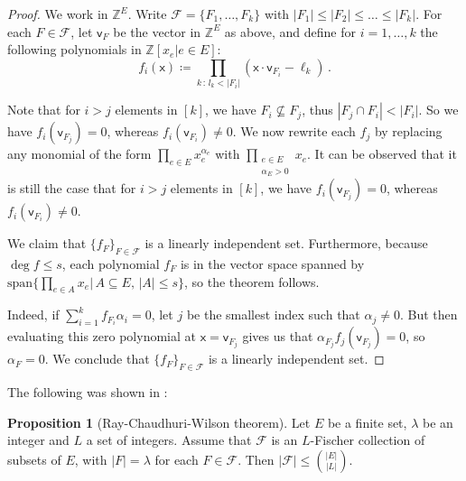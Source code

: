 \documentclass[12pt]{amsart}
\theoremstyle{definition}
\newtheorem{prop}[thm]{Proposition}
\newcommand{\Z}{\mathbb{Z}}
\newcommand{\FF}{\mathcal F}
\newcommand{\vv}{\mathsf{v}}
\newcommand{\vx}{\mathsf{x}}
\newcommand{\spn}{\mathrm{span}}
\begin{document}
\begin{proof}
We work in $\Z^E$.
Write $\FF = \{F_1, \ldots , F_k\}$ with $|F_1| \leq |F_2| \leq \ldots \leq |F_k|$.
For each $F \in \FF$, let $\vv_F$ be the vector in $\Z^E$ as above, and define for $i= 1, \ldots , k$ the following polynomials in $\Z[x_e | e \in E]$:
$$f_i(\vx) \coloneqq \prod_{k \, : \, l_k < |F_i|} (\vx \cdot \vv_{F_i} - \ell_k ) \, .$$

Note that for $i > j $ elements in $[k]$, we have $F_i \not\subseteq F_j$, thus $|F_j \cap F_i| <  |F_i|$.
So we have $f_i(\vv_{F_j}) = 0$, whereas $f_i(\vv_{F_i}) \neq 0$.
We now rewrite each $f_j$ by replacing any monomial of the form $\prod_{e\in E}x_e^{\alpha_e}$ with $\prod_{\substack{e\in E\\ \alpha_E > 0}}x_e$.
It can be observed that it is still the case that for $i > j $ elements in $[k]$, we have $f_i(\vv_{F_j}) = 0$, whereas $f_i(\vv_{F_i}) \neq 0$.

We claim that $\{ f_F \}_{F \in \FF}$ is a linearly independent set.
Furthermore, because $\deg f \leq s$, each polynomial $f_F$ is in the vector space spanned by $\spn\{\prod_{e \in A} x_e | \, A \subseteq E, \, |A| \leq s \}$, so the theorem follows.

Indeed, if $\sum_{i = 1}^k f_{F_i} \alpha_i =0$, let $j$ be the smallest index such that $\alpha_j \neq 0$.
But then evaluating this zero polynomial at $\vx = \vv_{F_j} $ gives us that $\alpha_{F_j} f_j(\vv_{F_j}) = 0$, so $\alpha_F = 0$. 
We conclude that $\{ f_F \}_{F \in \FF}$ is a linearly independent set.
\end{proof}

The following was shown in \cite{ray1975t}:

\begin{prop}[Ray-Chaudhuri-Wilson theorem]
Let $E$ be a finite set, $\lambda $ be an integer and $L$ a set of integers.
Assume that $\FF $ is an $L$-Fischer collection of subsets of $E$, with $|F| = \lambda $ for each $F \in \FF$.
Then $|\FF| \leq \binom{|E|}{|L|}$.
\end{prop}
\end{document}
